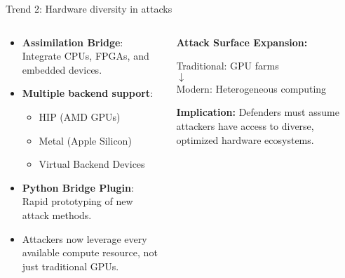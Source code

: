 \documentclass[aspectratio=169, lualatex, handout]{beamer}
\begin{document}
\begin{frame}{Trend 2: Hardware diversity in attacks}
	\begin{columns}[c]
		\begin{column}{0.55\textwidth}
			\begin{itemize}[<+->]
				\item \textbf{Assimilation Bridge}: Integrate CPUs, FPGAs, and embedded devices.
				\item \textbf{Multiple backend support}:
				      \begin{itemize}
					      \item HIP (AMD GPUs)
					      \item Metal (Apple Silicon)
					      \item Virtual Backend Devices
				      \end{itemize}
				\item \textbf{Python Bridge Plugin}: Rapid prototyping of new attack methods.
				\item Attackers now leverage every available compute resource, not just traditional GPUs.
			\end{itemize}
		\end{column}
		\begin{column}{0.45\textwidth}
			\begin{tcolorbox}[colback=black!5!white,colframe=ciphergray]
				\textbf{Attack Surface Expansion:}
				\vspace{0.2cm}
				\begin{center}
					Traditional: GPU farms\\
					$\downarrow$\\
					Modern: Heterogeneous computing
				\end{center}
				\vspace{0.3cm}
				\textcolor{cipherprimary}{\textbf{Implication:} \small Defenders must assume attackers have access to diverse, optimized hardware ecosystems.}
			\end{tcolorbox}
		\end{column}
	\end{columns}
\end{frame}
\end{document}

